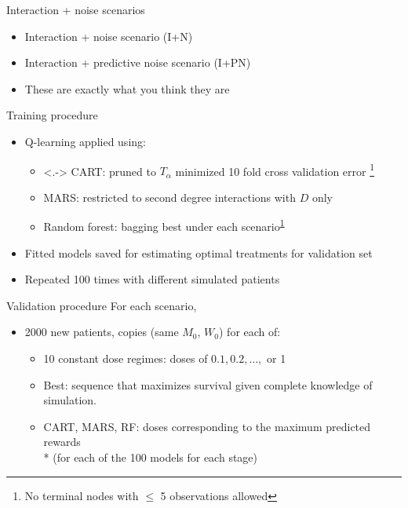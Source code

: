 \documentclass{beamer}
\begin{document}
\begin{frame}[c]{Interaction + noise scenarios}
  
  \begin{itemize}[<+->]
    \item Interaction + noise scenario (I+N)
    \item Interaction + predictive noise scenario (I+PN)
    \item These are exactly what you think they are
  \end{itemize}
\end{frame}


\begin{frame}[c]{Training procedure}
  \begin{itemize}[<+->]
    \item Q-learning applied using:
    \begin{itemize}
      \item<.-> CART: pruned to $T_{\alpha}$ minimized 10 fold cross validation error \footnote{\label{tree} No terminal nodes with $\leq$ 5 observations allowed}
      \item MARS: restricted to second degree interactions with $D$ only
      \item Random forest: bagging best under each scenario\textsuperscript{\ref{tree}}
    \end{itemize}
    \item Fitted models saved for estimating optimal treatments for validation set
    \item Repeated 100 times with different simulated patients
  \end{itemize}
\end{frame}

\begin{frame}[c]{Validation procedure}
  For each scenario,
  \begin{itemize}[<+(1)->]
    \item 2000 new patients, copies (same $M_{0}$, $W_{0}$) for each of:
  \begin{itemize}[<+(1)->]
    \item 10 constant dose regimes: doses of $0.1, 0.2, \ldots,$ or 1
        \item Best: sequence that maximizes survival given complete knowledge of simulation.
    \item CART, MARS, RF: doses corresponding to the maximum predicted rewards \\* (for each of the 100 models for each stage)
  \end{itemize}
  \end{itemize}
\end{frame}
\end{document}
